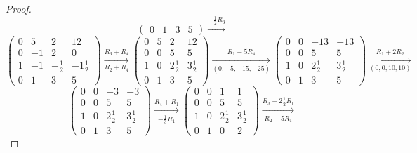 \documentclass{article}
\begin{document}
\begin{enumerate}
\begin{proof}
\[\begin{pmatrix}
                0  & 1   & 3 & 5
            \end{pmatrix} \xrightarrow{-\frac{1}{2}R_3}
        \]
        \[
            \begin{pmatrix}
                0 & 5   & 2            & 12            \\
                0 & - 1 & 2            & 0             \\
                1 & -1  & -\frac{1}{2} & -1\frac{1}{2} \\
                0 & 1   & 3            & 5
            \end{pmatrix} \xrightarrow[R_2 + R_4]{R_3 + R_4}
            \begin{pmatrix}
                0 & 5 & 2            & 12           \\
                0 & 0 & 5            & 5            \\
                1 & 0 & 2\frac{1}{2} & 3\frac{1}{2} \\
                0 & 1 & 3            & 5
            \end{pmatrix} \xrightarrow[(0,-5,-15,-25)]{R_1 - 5R_4}
            \begin{pmatrix}
                0 & 0 & -13          & -13          \\
                0 & 0 & 5            & 5            \\
                1 & 0 & 2\frac{1}{2} & 3\frac{1}{2} \\
                0 & 1 & 3            & 5
            \end{pmatrix} \xrightarrow[(0,0,10,10)]{R_1 + 2R_2}
        \]
        \[
            \begin{pmatrix}
                0 & 0 & -3           & -3           \\
                0 & 0 & 5            & 5            \\
                1 & 0 & 2\frac{1}{2} & 3\frac{1}{2} \\
                0 & 1 & 3            & 5
            \end{pmatrix} \xrightarrow[-\frac{1}{3}R_1]{R_4 + R_1}
            \begin{pmatrix}
                0 & 0 & 1            & 1            \\
                0 & 0 & 5            & 5            \\
                1 & 0 & 2\frac{1}{2} & 3\frac{1}{2} \\
                0 & 1 & 0            & 2
            \end{pmatrix} \xrightarrow[R_2 - 5R_1]{R_3 - 2\frac{1}{2}R_1}
\]
\end{proof}
\end{enumerate}
\end{document}
